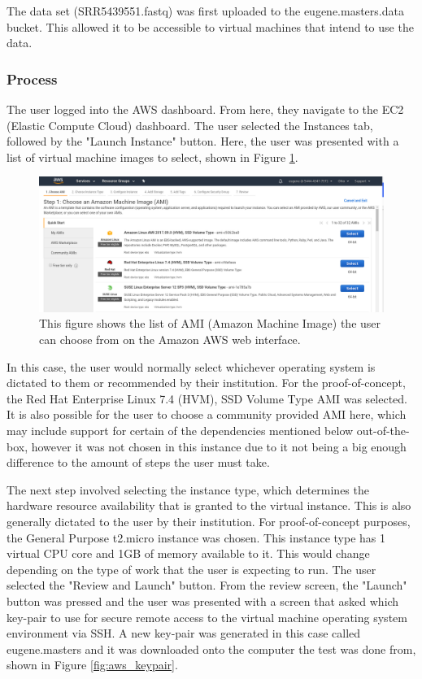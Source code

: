 The data set (SRR5439551.fastq) was first uploaded to the eugene.masters.data bucket. This allowed it to be accessible to virtual machines that intend to use the data.

\subsubsection{Process}

The user logged into the AWS dashboard. From here, they navigate to the EC2 (Elastic Compute Cloud) dashboard. The user selected the Instances tab, followed by the "Launch Instance" button. Here, the user was presented with a list of virtual machine images to select, shown in Figure \ref{fig:aws_ami}.

\begin{figure}[h!]
\centering
\includegraphics[width=\textwidth]{Figures/4_aws_select_instance.png}
\decoRule
\caption[List of Amazon Machine Images Available on AWS]{This figure shows the list of AMI (Amazon Machine Image) the user can choose from on the Amazon AWS web interface.}
\label{fig:aws_ami}
\end{figure}

In this case, the user would normally select whichever operating system is dictated to them or recommended by their institution. For the proof-of-concept, the Red Hat Enterprise Linux 7.4 (HVM), SSD Volume Type AMI was selected. It is also possible for the user to choose a community provided AMI here, which may include support for certain of the dependencies mentioned below out-of-the-box, however it was not chosen in this instance due to it not being a big enough difference to the amount of steps the user must take.

The next step involved selecting the instance type, which determines the hardware resource availability that is granted to the virtual instance. This is also generally dictated to the user by their institution. For proof-of-concept purposes, the General Purpose t2.micro instance was chosen. This instance type has 1 virtual CPU core and 1GB of memory available to it. This would change depending on the type of work that the user is expecting to run. The user selected the "Review and Launch" button. From the review screen, the "Launch" button was pressed and the user was presented with a screen that asked which key-pair to use for secure remote access to the virtual machine operating system environment via SSH. A new key-pair was generated in this case called eugene.masters and it was downloaded onto the computer the test was done from, shown in Figure \ref{fig:aws_keypair}.

